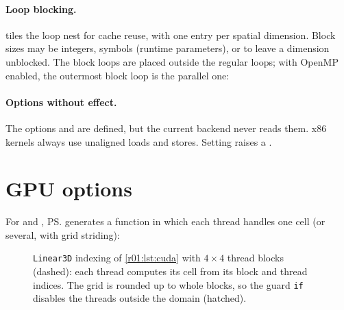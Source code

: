 \paragraph{Loop blocking.}
 tiles the loop nest for cache reuse, with one
entry per spatial dimension. Block sizes may be integers, symbols (runtime parameters),
or  to leave a dimension unblocked. The block loops are placed outside the
regular loops; with OpenMP enabled, the outermost block loop is the parallel one:

\paragraph{Options without effect.}
The options  and
 are defined, but the current backend never
reads them. x86 kernels always use unaligned loads and stores. Setting
 raises a .

\section{GPU options}\label{r01:sec:gpu-options}

For  and , \ps{} generates a 
function in which each thread handles one cell (or several, with grid striding):

\begin{figure}[htbp]
  \centering
  
  \caption[\texttt{Linear3D} GPU indexing]{\texttt{Linear3D} indexing of \cref{r01:lst:cuda} with $4\times4$ thread blocks (dashed): each thread computes its cell from its block and thread indices. The grid is rounded up to whole blocks, so the guard \texttt{if} disables the threads outside the domain (hatched).}
  \label{r01:fig:gpu-mapping}
\end{figure}

